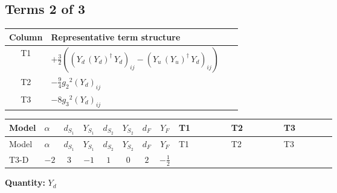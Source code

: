 \documentclass[8pt]{article}
\begin{document}
\begin{landscape}
\subsection*{Terms 2 of 3}
\begin{center}
\begin{tabular}{@{}c >{\raggedright\arraybackslash}p{0.82\linewidth}@{}}
\toprule
Column & Representative term structure \\
\midrule
T1 & \(\displaystyle +\frac{3}{2} (\left({Y_d}\,\left({Y_d}\right)^{\dagger}\,{Y_d}\right)_{ij}-\left({Y_u}\,\left({Y_u}\right)^{\dagger}\,{Y_d}\right)_{ij})\) \\
\midrule
T2 & \(\displaystyle -\frac{9}{4} {g_2}^2 \left({Y_d}\right)_{ij}\) \\
\midrule
T3 & \(\displaystyle -8 {g_3}^2 \left({Y_d}\right)_{ij}\) \\
\midrule
\bottomrule
\end{tabular}
\end{center}
\smallskip
\tiny
\begin{longtable}{@{}llcccccc >{\raggedright\arraybackslash}p{0.21\linewidth} >{\raggedright\arraybackslash}p{0.21\linewidth} >{\raggedright\arraybackslash}p{0.21\linewidth}@{}}
\toprule
Model & $\alpha$ & $d_{S_1}$ & $Y_{S_1}$ & $d_{S_2}$ & $Y_{S_2}$ & $d_F$ & $Y_F$ & T1 & T2 & T3 \\
\midrule
\endfirsthead
\toprule
Model & $\alpha$ & $d_{S_1}$ & $Y_{S_1}$ & $d_{S_2}$ & $Y_{S_2}$ & $d_F$ & $Y_F$ & T1 & T2 & T3 \\
\midrule
\endhead
T3-D & $-2$ & $3$ & $-1$ & $1$ & $0$ & $2$ & $-\frac{1}{2}$ & \scriptsize\adjustbox{max width=\linewidth}{$\begin{gathered} +\frac{3}{2} (\left({Y_d}\,\left({Y_d}\right)^{\dagger}\,{Y_d}\right)_{ij}-\left({Y_u}\,\left({Y_u}\right)^{\dagger}\,{Y_d}\right)_{ij})\end{gathered}$} & \scriptsize\adjustbox{max width=\linewidth}{$\begin{gathered} -\frac{9}{4} {g_2}^2 \left({Y_d}\right)_{ij}\end{gathered}$} & \scriptsize\adjustbox{max width=\linewidth}{$\begin{gathered} -8 {g_3}^2 \left({Y_d}\right)_{ij}\end{gathered}$} \\
\midrule
\bottomrule
\end{longtable}
\clearpage
\noindent\textbf{Quantity: }$Y_d$\par\smallskip

\end{landscape}
\end{document}
